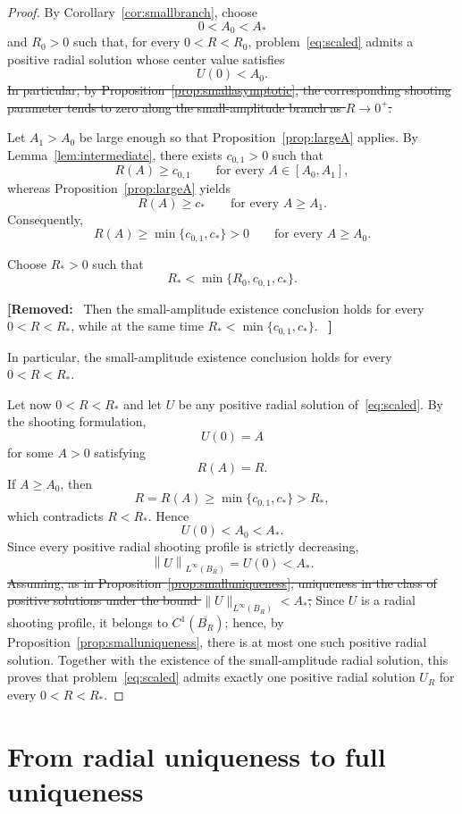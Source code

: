 \documentclass[11pt]{article}
\newcommand{\norm}[1]{\left\|#1\right\|}
\newcommand{\add}[1]{{\color{blue}#1}}
\newcommand{\del}[1]{{\color{red}\sout{#1}}}
\newenvironment{delblock}%
  {\par\color{red}\noindent\textbf{[Removed:}\ }%
  {\ \textbf{]}\par}
\newcommand{\oldrev}[1]{#1}
\theoremstyle{definition}
\begin{document}
\begin{proof}
\oldrev{By Corollary~\ref{cor:smallbranch}, choose
\[
0<A_0<A_*
\]
and $R_0>0$ such that, for every $0<R<R_0$,
problem~\eqref{eq:scaled} admits a positive radial solution whose
center value satisfies}
\[
U(0)<A_0.
\]
\del{In particular, by
Proposition~\ref{prop:smallasymptotic}, the corresponding shooting
parameter tends to zero along the small-amplitude branch as
$R\to0^+$.}

Let $A_1>A_0$ be large enough so that
Proposition~\ref{prop:largeA} applies. By
Lemma~\ref{lem:intermediate}, there exists $c_{0,1}>0$ such that
\[
R(A)\geq c_{0,1}
\qquad
\text{for every }A\in[A_0,A_1],
\]
whereas Proposition~\ref{prop:largeA} yields
\[
R(A)\geq c_*
\qquad
\text{for every }A\geq A_1.
\]
Consequently,
\[
R(A)\geq
\min\{c_{0,1},c_*\}>0
\qquad
\text{for every }A\geq A_0.
\]

Choose $R_*>0$ such that
\[
\oldrev{
R_*<
\min\{R_0,c_{0,1},c_*\}.
}
\]
\begin{delblock}
Then the small-amplitude existence conclusion holds
for every $0<R<R_*$, while at the same time
$R_*<\min\{c_{0,1},c_*\}$.
\end{delblock}
\add{In particular, the small-amplitude existence conclusion holds for
every $0<R<R_*$.}

Let now $0<R<R_*$ and let $U$ be any positive radial solution
of~\eqref{eq:scaled}. By the shooting formulation,
\[
U(0)=A
\]
for some $A>0$ satisfying
\[
R(A)=R.
\]
If $A\geq A_0$, then
\[
R=R(A)
\geq
\min\{c_{0,1},c_*\}
>
R_*,
\]
which contradicts $R<R_*$. Hence
\[
U(0)<A_0<A_*.
\]
Since every positive radial shooting profile is strictly decreasing,
\[
\norm{U}_{L^\infty(B_R)}
=
U(0)
<
A_*.
\]
\del{Assuming, as in
Proposition~\ref{prop:smalluniqueness}, uniqueness in the class of
positive solutions under the bound
$\|U\|_{L^\infty(B_R)}<A_*$,}
\add{Since $U$ is a radial shooting profile, it belongs to
$C^1(\overline{B_R})$; hence, by
Proposition~\ref{prop:smalluniqueness},}
there is at most one such positive \oldrev{radial} solution.
Together with the existence of the small-amplitude radial solution,
this proves that problem~\eqref{eq:scaled} admits exactly one positive
radial solution $U_R$ for every $0<R<R_*$.
\end{proof}
    


  
\section{From radial uniqueness to full uniqueness}
\end{document}
